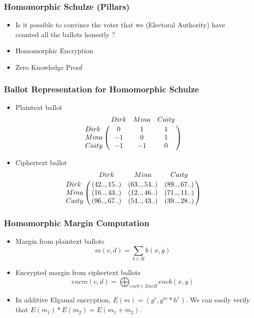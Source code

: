 \documentclass{beamer}
\begin{document}
\begin{frame}
\frametitle{Homomorphic Schulze (Pillars)}
\begin{itemize}
\item Is it possible to convince the voter that we (Electoral
Authority) have counted all the ballots honestly ? \pause
\item Homomorphic Encryption 
\item Zero Knowledge Proof
\end{itemize}

\end{frame}

\begin{frame}
\frametitle{Ballot Representation for Homomorphic Schulze}
\begin{itemize}
\item Plaintext ballot 
$$\bordermatrix{\text{}& Dirk & Mina & Caity \cr
                Dirk & 0 &  1 & 1\cr
                Mina & -1 &  0 & 1\cr
                Caity & -1 &  -1 & 0}$$ \pause
  
\item Ciphertext ballot 
  $$\bordermatrix{\text{}& Dirk & Mina & Caity \cr
                Dirk & (42.., 15..) & (63.., 54..) & (89.., 67..)\cr
                Mina & (16.., 43..) & (12.., 46..) & (71.., 11..)\cr
                Caity & (96.., 67..) & (54.., 43..) & (39.., 28..)}$$
 
  \end{itemize}
\end{frame}


\begin{frame}
\frametitle{Homomorphic Margin Computation}
\begin{itemize}
 \item Margin from plaintext ballots 
    \[ m(c, d) = \sum_{b \in B} b(x, y) \]\pause

 \item Encrypted margin from ciphertext ballots
      \[ encm(c, d) = \bigoplus_{encb \in EncB} encb(x, y) \] \pause
      
 \item In additive Elgamal encryption, $E(m) = (g^r, g^m * h^r)$. We can easily 
  	verify that $E(m_{1}) * E(m_{2}) = E (m_{1} + m_{2})$.     
\end{itemize}

\end{frame}
\end{document}
